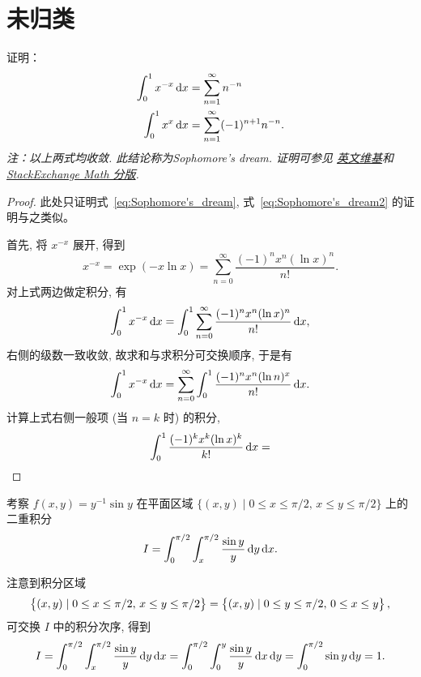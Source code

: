 \section{未归类}
\begin{exercise}
    证明：
    \begin{align}
    \int_0^1 x^{-x} \mathop{}\!\mathrm{d} x &= \sum_{n = 1}^{\infty} n^{-n} \label{eq:Sophomore's_dream}\\
    \int_0^1 x^x \mathop{}\!\mathrm{d} x &= \sum_{n = 1}^{\infty} (-1)^{n+1} n^{-n}. \label{eq:Sophomore's_dream2}
    \end{align}
    \emph{注：以上两式均收敛. 此结论称为Sophomore's dream. 证明可参见%
        \href{https://en.wikipedia.org/wiki/Sophomore\%27s_dream}{英文维基}和 %
        \href{http://math.stackexchange.com/questions/237513/series-as-an-integral-sophomores-dream}{StackExchange Math 分版}.}
\end{exercise}

\begin{proof}
    此处只证明式~\eqref{eq:Sophomore's_dream}, 式~\eqref{eq:Sophomore's_dream2} 的证明与之类似。
    
    首先, 将 $x^{-x}$ 展开, 得到
    \begin{equation*}
    x^{-x} = \exp(-x \ln x) = \sum_{n = 0}^{\infty} \frac{(-1)^n x^n (\ln x)^n}{n!}.
    \end{equation*}
    对上式两边做定积分, 有
    \begin{equation*}
    \int_0^1 x^{-x} \mathop{}\!\mathrm{d} x 
    = \int_0^1 \sum_{n = 0}^{\infty} \frac{(-1)^n x^n (\ln x)^n}{n!} \mathop{}\!\mathrm{d} x,
    \end{equation*}
    右侧的级数一致收敛, 故求和与求积分可交换顺序, 于是有
    \begin{equation*}
    \int_0^1 x^{-x} \mathop{}\!\mathrm{d} x 
    = \sum_{n = 0}^{\infty} \int_0^1 \frac{(-1)^n x^n (\ln n)^x}{n!} \mathop{}\!\mathrm{d} x.
    \end{equation*}
    计算上式右侧一般项 (当 $n = k$ 时) 的积分, 
    \[
    \int_0^1 \frac{(-1)^k x^k (\ln x)^k}{k!} \mathop{}\!\mathrm{d} x
    = 
    \]
\end{proof}

\begin{exercise}
    考察 $f(x, y) = y^{-1} \sin y$ 在平面区域 $\{ (x, y) \mid 0 \le x \le \pi/2,\, x \le y \le \pi / 2 \}$ 上的二重积分
    \[
    I= \int_0^{\pi / 2} \int_x^{\pi / 2} \frac{\sin y}{y} \mathop{}\!\mathrm{d} y \mathop{}\!\mathrm{d} x.
    \]
\end{exercise}

\begin{solution}
    注意到积分区域
    \[
    \set[1]{ (x, y) \mid 0 \le x \le \pi/2,\, x \le y \le \pi / 2 }
    = \set[1]{ (x, y) \mid 0 \le y \le \pi/2,\, 0 \le x \le y },
    \]
    可交换 $I$ 中的积分次序, 得到
    \[
    I 
    = \int_0^{\pi / 2} \int_x^{\pi / 2} \frac{\sin y}{y} \mathop{}\!\mathrm{d} y \mathop{}\!\mathrm{d} x
    = \int_0^{\pi / 2} \int_0^y \frac{\sin y}{y} \mathop{}\!\mathrm{d} x \mathop{}\!\mathrm{d} y
    = \int_0^{\pi / 2} \sin y \mathop{}\!\mathrm{d} y
    = 1.
    \]
\end{solution}

